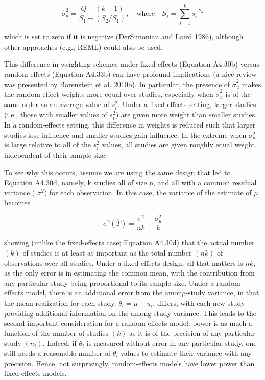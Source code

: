 \documentclass{article}
\begin{document}
\begin{equation}
\widehat{\sigma}_{u}^{2}=\frac{Q-(k-1)}{S_{1}-(S_{2}/S_{1})},\quad\mathrm{w h e r e}\quad S_{j}=\sum_{i=1}^{k}s_{i}^{-2j}
\end{equation}

which is set to zero if it is negative (DerSimonian and Laird 1986), although other approaches (e.g., REML) could also be used.

This difference in weighting schemes under fixed effects (Equation A4.30b) versus random effects (Equation A4.33b) can have profound implications (a nice review was presented by Borenstein et al. 2010b). In particular, the presence of  $ \widehat{\sigma}_u^2 $ makes the random-effect weights more equal over studies, especially when  $ \widehat{\sigma}_u^2 $ is of the same order as an average value of  $ s_i^2 $. Under a fixed-effects setting, larger studies (i.e., those with smaller values of  $ s_i^2 $) are given more weight than smaller studies. In a random-effects setting, this difference in weights is reduced such that larger studies lose influence and smaller studies gain influence. In the extreme when  $ \sigma_u^2 $ is large relative to all of the  $ s_i^2 $ values, all studies are given roughly equal weight, independent of their sample size.

To see why this occurs, assume we are using the same design that led to Equation A4.30d, namely, k studies all of size n, and all with a common residual variance ( $ \sigma^{2} $) for each observation. In this case, the variance of the estimate of  $ \mu $ becomes

\begin{equation}
\sigma^{2}(\overline{T})=\frac{\sigma^{2}}{nk}+\frac{\sigma_{u}^{2}}{k}
\end{equation}

showing (unlike the fixed-effects case; Equation A4.30d) that the actual number  $ (k) $ of studies is at least as important as the total number  $ (nk) $ of observations over all studies. Under a fixed-effects design, all that matters is  $ nk $, as the only error is in estimating the common mean, with the contribution from any particular study being proportional to its sample size. Under a random-effects model, there is an additional error from the among-study variance, in that the mean realization for each study,  $ \theta_i = \mu + u_i $, differs, with each new study providing additional information on the among-study variance. This leads to the second important consideration for a random-effects model: power is as much a function of the number of studies  $ (k) $ as it is of the precision of any particular study  $ (n_i) $. Indeed, if  $ \theta_i $ is measured without error in any particular study, one still needs a reasonable number of  $ \theta_i $ values to estimate their variance with any precision. Hence, not surprisingly, random-effects models have lower power than fixed-effects models.
\end{document}
